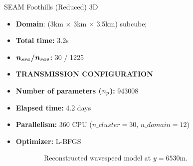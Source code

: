 \begin{frame}{SEAM Foothills (Reduced) 3D}

  \vspace{-0.6cm}
   \begin{multicols}{2}

     \begin{itemize}
       \scriptsize
    \item \textbf{Domain}: (3km $\times$ 3km $\times$ 3.5km) subcube;
    \item \textbf{Total time:} 3.2s
    \item \textbf{$\boldsymbol{{n_{src}}}$/$\boldsymbol{{n_{rcv}}}$:} 30 / 1225
    \item \textbf{TRANSMISSION CONFIGURATION}
      \columnbreak
    \item \textbf{Number of parameters (${n_{p}}$):} 943008
    \item \textbf{Elapsed time:} 4.2 days
    \item \textbf{Parallelism:} 360 CPU ($n\_cluster=30$, $n\_domain=12$)
    \item \textbf{Optimizer:} L-BFGS
     \end{itemize}
   \end{multicols}
     \scriptsize
     \setlength{\modelwidth}{4.5cm}

\begin{figure}[!htbp]
\begin{subfigure}{0.3\textwidth}
\renewcommand{\modelfile}{image/seam1_y1}

\caption*{\scriptsize{Reconstructed wavespeed model at $y=6530$m.}}
\end{subfigure}
\setlength{\plotwidth}{4cm}
\setlength{\plotheight}{3.0cm}
\begin{subfigure}{0.3\textwidth}
\centering
\label{cf_seam}
\end{subfigure}

\end{figure}
\end{frame}


